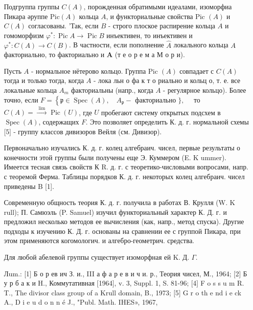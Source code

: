 \documentclass[10pt]{article}
\begin{document}
Подгруппа группы $C(A)$, порожденная обратимыми идеалами, изоморфиа Пикара әруппе $\mathrm{Pic}(A)$ кольца $A$, и функториальные свойства Pic $(A)$ и $C(A)$ согласованы. 'Так, если $B$ - строго плоское распирение кольца $A$ и гомоморфизм $\varphi^{*}: \operatorname{Pic} A \rightarrow \operatorname{Pic} B$ инъективен, то инъективен и $\varphi^{*}: C(A) \rightarrow C(B)$. В частности, если пополнение $\hat{A}$ локального кольца $A$ факториально, то факториально и $\boldsymbol{A}$ (т е о р е м а М о р и).



Пусть $A$ - нормальное нётерово кольцо. Группа Pic $(A)$ совпадает с $C(A)$ тогда и только тогда, когда $A$ - лока льн о фа к т о риально и кольц о, т. е. все локальные кольца $A_{m}$ факториальны (напр., когда $A$ - регулярное кольцо). Более точно, если $F=\left\{\mathfrak{p} \in \operatorname{Spec}(A), \quad A_{\mathfrak{p}}-\right.$ факториально $\}, \quad$ то $C(A)=\stackrel{\text { lim }}{\longrightarrow} \operatorname{Pic}(U)$, где $U$ пробегают систему открытых подсхем в $\operatorname{Spec}(A)$, содержащих $F$. Это позволяет определить $К$. д. г. нормальной схемы [5] - группу классов дивизоров Вейля (см. Дивизор).



Первоначально изучались К. д. г. колец алгебраич. чисел, первые результаты о конечности этой группы были получены еще Э. Куммером (E. K ummer). Имеется тесная связь свойств К R. д. г. с теоретико-числовыми вопросами, напр. с теоремой Ферма. Таблицы порядков К. д. г. некоторых колец алгебраич. чисел приведены B [1].



Современную общность теория К. д. г. получила в работах В. Крулля (W. K rull); П. Самюэль (P. Samuel) изучил функториальный характер К. Д. г. и предложил несколько методов ее вычисления (как, напр., метод спуска). Другие подходы к изучению К. Д. г. основаны на сравнении ее с группой Пикара, при этом применяются когомологич. и алгебро-геометрич. средства.



Для любой абелевой группы существует изоморфная ей $\mathrm{K}$. Д. $\Gamma$.



Лum.: [1] Б о р ев ич З. и., III а ф а р е в и ч и. р., Теория чисел, М., 1964; [2] Б у р б а к и H., Коммутативная [1964], v. 3, Suppl. 1, S. 81-96; [4] F o s s u m R. T., The divisor class group of a Krull domain, B., 1973; [5] G r o th e nd i e ck A., D i e u d o n n é J., "Publ. Math. IHES», 1967,
\end{document}
